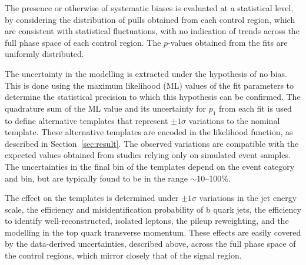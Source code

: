 The presence or otherwise of systematic biases is evaluated at a
statistical level, by considering the distribution of pulls obtained
from each control region, which are consistent with statistical
fluctuations, with no indication of trends across the full phase space
of each control region. The $p$-values obtained from the fits are
uniformly distributed. 

The uncertainty in the \HTmiss modelling is extracted under the
hypothesis of no bias. This is done using the maximum likelihood (ML)
values of the fit parameters to determine the statistical precision to
which this hypothesis can be confirmed. The quadrature sum of the ML
value and its uncertainty for $p_1$ from each fit is used to define
alternative templates that represent $\pm1\sigma$ variations to the
nominal \HTmiss template. These alternative templates are encoded in
the likelihood function, as described in Section~\ref{sec:result}. The
observed variations are compatible with the expected values obtained
from studies relying only on simulated event samples. The
uncertainties in the final \HTmiss bin of the templates depend on the
event category and \scalht bin, but are typically found to be in the
range $\sim$10--100\%.

The effect on the \HTmiss templates is determined under $\pm1\sigma$
variations in the jet energy scale, the efficiency and
misidentification probability of b quark jets, the efficiency to
identify well-reconstructed, isolated leptons, the pileup reweighting,
and the modelling in the top quark transverse momentum. These effects
are easily covered by the data-derived uncertainties, described above,
across the full phase space of the control regions, which mirror
closely that of the signal region.





